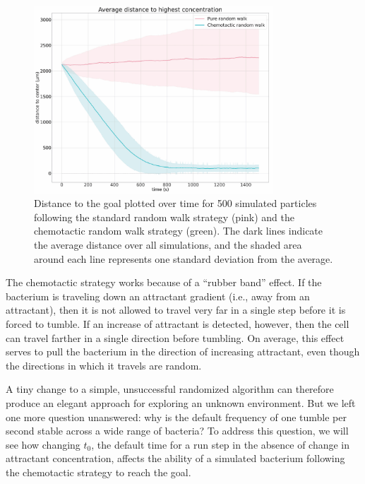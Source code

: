 \begin{figure}[h]
\centering
\mySfFamily
\includegraphics[width = 0.8\textwidth]{../images_CMYK/chemotaxis_performance_compare_uniform}
\caption{Distance to the goal plotted over time for 500 simulated particles following the standard random walk strategy (pink) and the chemotactic random walk strategy (green). The dark lines indicate the average distance over all simulations, and the shaded area around each line represents one standard deviation from the average.}
\label{fig:chemotaxis_performance_compare_uniform}
\end{figure}

The chemotactic strategy works because of a ``rubber band'' effect. If the bacterium is traveling down an attractant gradient (i.e., away from an attractant), then it is not allowed to travel very far in a single step before it is forced to tumble. If an increase of attractant is detected, however, then the cell can travel farther in a single direction before tumbling. On average, this effect serves to pull the bacterium in the direction of increasing attractant, even though the directions in which it travels are random.

A tiny change to a simple, unsuccessful randomized algorithm can therefore produce an elegant approach for exploring an unknown environment. But we left one more question unanswered: why is the default frequency of one tumble per second stable across a wide range of bacteria? To address this question, we will see how changing $t_0$, the default time for a run step in the absence of change in attractant concentration, affects the ability of a simulated bacterium following the chemotactic strategy to reach the goal.

